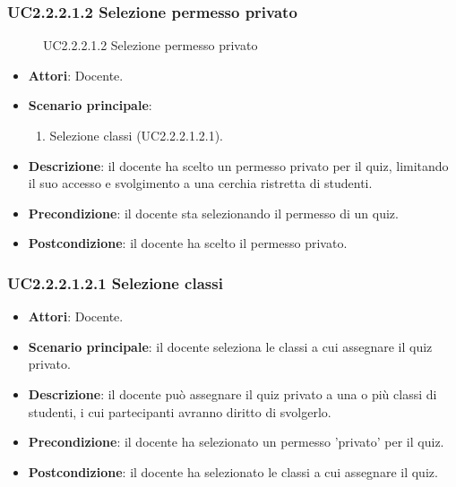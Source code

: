 \subsubsection{UC2.2.2.1.2 Selezione permesso privato}
\begin{figure}[H]
\centering
\noindent{}
\caption{UC2.2.2.1.2 Selezione permesso privato}
\end{figure}
\begin{itemize}
\item \textbf{Attori}: Docente.
\item \textbf{Scenario principale}:
\begin{enumerate}
\item Selezione classi (UC2.2.2.1.2.1).
\end{enumerate}
\item \textbf{Descrizione}: il docente ha scelto un permesso privato per il quiz, limitando il suo accesso e svolgimento a una cerchia ristretta di studenti.
\item \textbf{Precondizione}: il docente sta selezionando il permesso di un quiz.
\item \textbf{Postcondizione}: il docente ha scelto il permesso privato.
\end{itemize}
\subsubsection{UC2.2.2.1.2.1 Selezione classi}
\begin{itemize}
\item \textbf{Attori}: Docente.
\item \textbf{Scenario principale}: il docente seleziona le classi a cui assegnare il quiz privato.
\item \textbf{Descrizione}: il docente può assegnare il quiz privato a una o più classi di studenti, i cui partecipanti avranno diritto di svolgerlo.
\item \textbf{Precondizione}: il docente ha selezionato un permesso 'privato' per il quiz.
\item \textbf{Postcondizione}: il docente ha selezionato le classi a cui assegnare il quiz.
\end{itemize}
